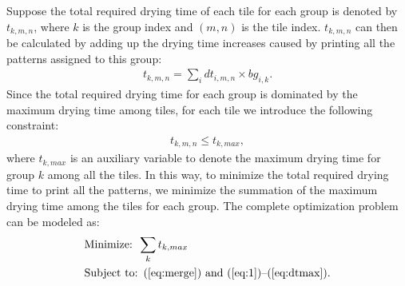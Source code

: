 Suppose the total required drying time of each tile for each group 
is denoted by $t_{k,m,n}$,
where $k$ is the group index and $(m,n)$ is the tile index.
$t_{k,m,n}$ can then be calculated by adding up the drying time increases caused by printing all the patterns assigned to this group:
\begin{align}
t_{k,m,n} = \sum_i dt_{i,m,n} \times bg_{i,k}. \label{eq:dtmnk}
\end{align}
Since the total required drying time for each group is dominated by the maximum drying time among tiles,
for each tile we introduce the following constraint:
\begin{align}
t_{k,m,n} \leq t_{k,max}, \label{eq:dtmax}
\end{align}
where $t_{k,max}$ is an auxiliary variable to denote the maximum drying time for group $k$ among all the tiles.
In this way,
to minimize the total required drying time to print all the patterns,
we minimize the summation of the maximum drying time among the tiles for each group.
The complete optimization problem can be modeled as:
\begin{align}
&\text{Minimize:}   \hskip 5pt \sum_k t_{k,max} \nonumber \\
&\text{Subject to:} \hskip 5pt \text{(\ref{eq:merge}) and (\ref{eq:1})--(\ref{eq:dtmax}).} \nonumber
\end{align}
